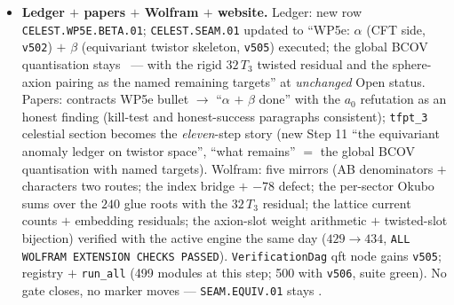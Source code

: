 \begin{itemize}[leftmargin=1.5em]
count $0$, $c$-prefactor $-31/48\neq-\tfrac13$. \mC\ dictionaries ($\mathrm{CS}(\rho)\bmod1$ $=$
discriminant weight; $32=(h,h){+}(h',h')$; $-30=-h^\vee$; $\Omega$-contraction). \mO\ the global
BCOV/KS quantisation, non-fixed-point contributions, the $O(-2)$ bulk axion, CPS level-from-flux,
the pairing $32\,T_3\leftrightarrow$ sphere axions. VERDICT B; the kill test does not fire on the
equivariant skeleton.
\item \textbf{Ledger $+$ papers $+$ Wolfram $+$ website.} Ledger: new row
\texttt{CELEST.WP5E.BETA.01}; \texttt{CELEST.SEAM.01} updated to ``WP5e: $\alpha$ (CFT side,
\texttt{v502}) $+$ $\beta$ (equivariant twistor skeleton, \texttt{v505}) executed; the global BCOV
quantisation stays \mO\ --- with the rigid $32\,T_3$ twisted residual and the sphere-axion pairing
as the named remaining targets'' at \emph{unchanged} Open status. Papers: contracts WP5e bullet
$\to$ ``$\alpha$ $+$ $\beta$ done'' with the $a_0$ refutation as an honest finding (kill-test and
honest-success paragraphs consistent); \texttt{tfpt\_3} celestial section becomes the
\emph{eleven}-step story (new Step 11 ``the equivariant anomaly ledger on twistor space'', ``what
remains'' $=$ the global BCOV quantisation with named targets). Wolfram: five mirrors (AB
denominators $+$ characters two routes; the index bridge $+$ $-78$ defect; the per-sector Okubo
sums over the $240$ glue roots with the $32\,T_3$ residual; the lattice current counts $+$
embedding residuals; the axion-slot weight arithmetic $+$ twisted-slot bijection) verified with
the active engine the same day ($429\to434$, \texttt{ALL WOLFRAM EXTENSION CHECKS PASSED}).
\texttt{VerificationDag} qft node gains \texttt{v505}; registry $+$ \texttt{run\_all} (499
modules at this step; 500 with \texttt{v506}, suite green). No gate closes, no marker moves ---
\texttt{SEAM.EQUIV.01} stays \mO.
\end{itemize}

